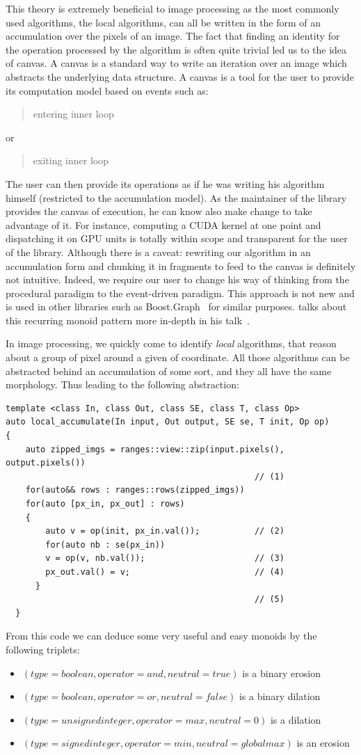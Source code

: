 This theory is extremely beneficial to image processing as the most commonly used algorithms, the local algorithms, can
all be written in the form of an accumulation over the pixels of an image. The fact that finding an identity for the
operation processed by the algorithm is often quite trivial led us to the idea of canvas. A canvas is a standard way to
write an iteration over an image which abstracts the underlying data structure. A canvas is a tool for the user to
provide its computation model based on events such as: \blockquote{entering inner loop} or \blockquote{exiting inner
  loop}. The user can then provide its operations as if he was writing his algorithm himself (restricted to the
accumulation model). As the maintainer of the library provides the canvas of execution, he can know also make change to
take advantage of it. For instance, computing a CUDA kernel at one point and dispatching it on GPU units is totally
within scope and transparent for the user of the library. Although there is a caveat: rewriting our algorithm in an
accumulation form and chunking it in fragments to feed to the canvas is definitely not intuitive. Indeed, we require our
user to change his way of thinking from the procedural paradigm to the event-driven paradigm. This approach is not new
and is used in other libraries such as Boost.Graph~\parencite{siek.2001.boostgraph} for similar purposes.
\citeauthor{dean.2019.monoids} talks about this recurring monoid pattern more in-depth in his
talk~\parencite{dean.2019.monoids}.

In image processing, we quickly come to identify \emph{local} algorithms, that reason about a group of pixel around a
given of coordinate. All those algorithms can be abstracted behind an accumulation of some sort, and they all have the
same morphology. Thus leading to the following abstraction:
\begin{verbatim}
template <class In, class Out, class SE, class T, class Op>
auto local_accumulate(In input, Out output, SE se, T init, Op op)
{
    auto zipped_imgs = ranges::view::zip(input.pixels(), output.pixels())
                                                  // (1)
    for(auto&& rows : ranges::rows(zipped_imgs))
    for(auto [px_in, px_out] : rows)
    {
        auto v = op(init, px_in.val());           // (2)
        for(auto nb : se(px_in))
        v = op(v, nb.val());                      // (3)
        px_out.val() = v;                         // (4)
      }
                                                  // (5)
  }
\end{verbatim}
From this code we can deduce some very useful and easy monoids by the following triplets:
\begin{itemize}
  \item \((type = boolean, operator = and, neutral = true)\) is a binary erosion
  \item \((type = boolean, operator = or, neutral = false)\) is a binary dilation
  \item \((type = unsigned integer, operator = max, neutral = 0)\) is a dilation
  \item \((type = signed integer, operator = min, neutral = global max)\) is an erosion
\end{itemize}

